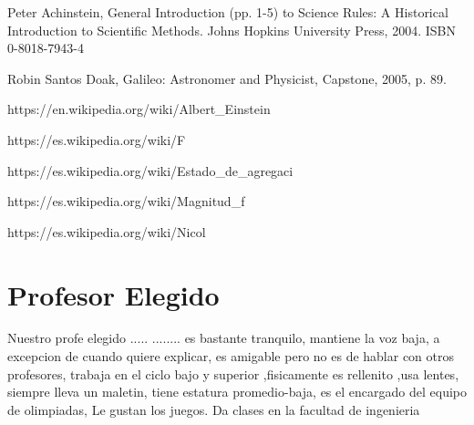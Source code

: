 \documentclass[11pt]{article}
\begin{document}
\begin{thebibliography}{100}
    
 Peter Achinstein, General Introduction (pp. 1-5) to Science Rules: A Historical Introduction to Scientific Methods. Johns Hopkins University Press, 2004. ISBN 0-8018-7943-4

 Robin Santos Doak, Galileo: Astronomer and Physicist, Capstone, 2005, p. 89.
  
 https://en.wikipedia.org/wiki/Albert_Einstein

 https://es.wikipedia.org/wiki/F%
  
 https://es.wikipedia.org/wiki/Estado_de_agregaci%
  
 https://es.wikipedia.org/wiki/Magnitud_f%
  
 https://es.wikipedia.org/wiki/Nicol%


\section{Profesor Elegido}

Nuestro profe elegido ..... ........  es bastante tranquilo, mantiene la voz baja, a excepcion de cuando quiere explicar, es amigable pero no es de hablar con otros profesores,   trabaja en el ciclo bajo y superior ,fisicamente es rellenito ,usa lentes, siempre lleva un maletin, tiene estatura promedio-baja, es el encargado del equipo de olimpiadas, Le gustan los juegos. Da clases en la facultad de ingenieria  


\end{thebibliography}

\printglossary
\end{document}
